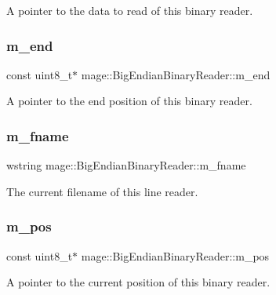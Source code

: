 A pointer to the data to read of this binary reader. \hypertarget{classmage_1_1_big_endian_binary_reader_a87f169955c550884ced880e646d22494}{}\label{classmage_1_1_big_endian_binary_reader_a87f169955c550884ced880e646d22494} 
\subsubsection{\texorpdfstring{m\+\_\+end}{m\_end}}
{\footnotesize\ttfamily const uint8\+\_\+t$\ast$ mage\+::\+Big\+Endian\+Binary\+Reader\+::m\+\_\+end\hspace{0.3cm}{\ttfamily [private]}}

A pointer to the end position of this binary reader. \hypertarget{classmage_1_1_big_endian_binary_reader_a0f836aec582a59f156b64bffb9653e41}{}\label{classmage_1_1_big_endian_binary_reader_a0f836aec582a59f156b64bffb9653e41} 
\subsubsection{\texorpdfstring{m\+\_\+fname}{m\_fname}}
{\footnotesize\ttfamily wstring mage\+::\+Big\+Endian\+Binary\+Reader\+::m\+\_\+fname\hspace{0.3cm}{\ttfamily [private]}}

The current filename of this line reader. \hypertarget{classmage_1_1_big_endian_binary_reader_ad5f1d1af53b4863cbe1f3677492dd978}{}\label{classmage_1_1_big_endian_binary_reader_ad5f1d1af53b4863cbe1f3677492dd978} 
\subsubsection{\texorpdfstring{m\+\_\+pos}{m\_pos}}
{\footnotesize\ttfamily const uint8\+\_\+t$\ast$ mage\+::\+Big\+Endian\+Binary\+Reader\+::m\+\_\+pos\hspace{0.3cm}{\ttfamily [private]}}

A pointer to the current position of this binary reader. 